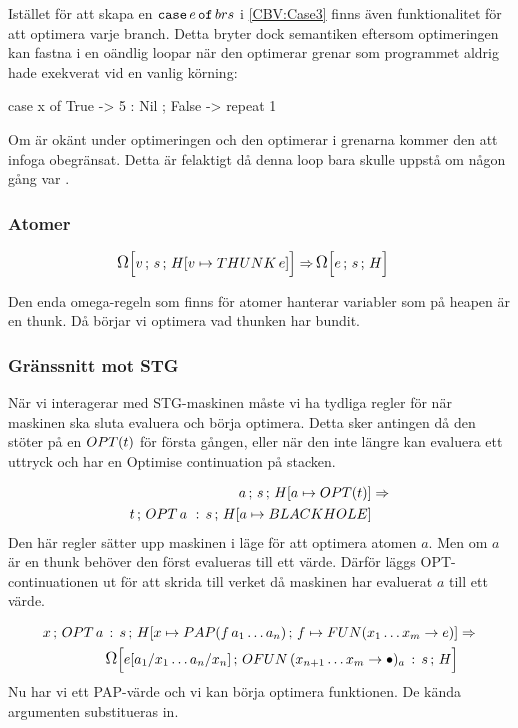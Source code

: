 \documentclass[../Optimise]{subfiles}
\begin{document}
Istället för att skapa en $\eCase e brs$ i \eqref{CBV:Case3} finns även
funktionalitet för att
optimera varje branch. Detta bryter dock semantiken eftersom optimeringen kan fastna
i en oändlig loopar när den optimerar grenar som programmet aldrig hade exekverat
vid en vanlig körning: 

\begin{codeEx}
case x of
    { True  -> 5 : Nil
    ; False -> repeat 1
    }
\end{codeEx}

Om  är okänt under optimeringen och den optimerar i grenarna kommer den
att infoga  obegränsat. Detta är felaktigt då denna loop bara skulle uppstå
om  någon gång var .

\subsubsection{Atomer}
\begin{align}
\OMEGA s{\heap{v}{\THUNK{e}}}v \Rightarrow &\, \OMEGA sHe
\end{align}

Den enda omega-regeln som finns för atomer hanterar variabler som på 
heapen är en thunk. Då börjar vi optimera vad thunken har bundit.

\subsubsection{Gränssnitt mot STG}
När vi interagerar med STG-maskinen måste vi ha tydliga regler
för när maskinen ska sluta evaluera och börja optimera. Detta sker
antingen då den stöter på en $\OPT t$ för första gången, eller när den
inte längre kan evaluera ett uttryck och har en Optimise continuation
på stacken.

\begin{align}
\mc as{\heap a{\OPT t}} & \Rightarrow\\
\mc t{\cOPT{a\,}s}{\heap a{\BH}} \nonumber
\end{align}
Den här regler sätter upp maskinen i läge för att optimera atomen $a$. Men om $a$
är en thunk behöver den först evalueras till ett värde. Därför läggs
OPT-continuationen ut för att skrida till verket då maskinen har evaluerat
$a$ till ett värde.

\begin{align}
\mc x{\cOPT as}{\heapp x{\PAP f{a_{1}\ldots a_{n}}}f{\FUN{x_{1}\ldots x_{m}}e}} & \Rightarrow\\
\OMEGA{\cOFUN{x_{n+1}\ldots x_{m}}as}H{e[a_{1}/x_{1}\ldots a_{n}/x_{n}]} \nonumber
\end{align}
Nu har vi ett PAP-värde och vi kan börja optimera funktionen. De kända 
argumenten substitueras in.
\end{document}
